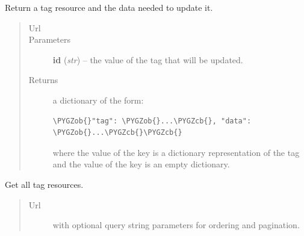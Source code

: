 \documentclass[letterpaper,10pt,english]{sphinxmanual}
\def\PYGZob{\char`\{}
\def\PYGZcb{\char`\}}
\begin{document}
\begin{fulllineitems}
\begin{fulllineitems}
\begin{quote}
\begin{description}
\end{description}\end{quote}

\end{fulllineitems}


\begin{fulllineitems}
\label{api:onlinelinguisticdatabase.controllers.tags.TagsController.edit}
Return a tag resource and the data needed to update it.
\begin{quote}\begin{description}
\item[{Url }] \leavevmode
{}

\item[{Parameters}] \leavevmode
\textbf{id} (\emph{str}) -- the  value of the tag that will be updated.

\item[{Returns}] \leavevmode

a dictionary of the form:

\begin{Verbatim}[commandchars=\\\{\}]
\PYGZob{}"tag": \PYGZob{}...\PYGZcb{}, "data": \PYGZob{}...\PYGZcb{}\PYGZcb{}
\end{Verbatim}

where the value of the  key is a dictionary representation of
the tag and the value of the  key is an empty dictionary.


\end{description}\end{quote}

\end{fulllineitems}


\begin{fulllineitems}
\label{api:onlinelinguisticdatabase.controllers.tags.TagsController.index}
Get all tag resources.
\begin{quote}\begin{description}
\item[{Url }] \leavevmode
{} with optional query string parameters for
ordering and pagination.


\end{description}
\end{quote}
\end{fulllineitems}
\end{fulllineitems}
\end{document}
